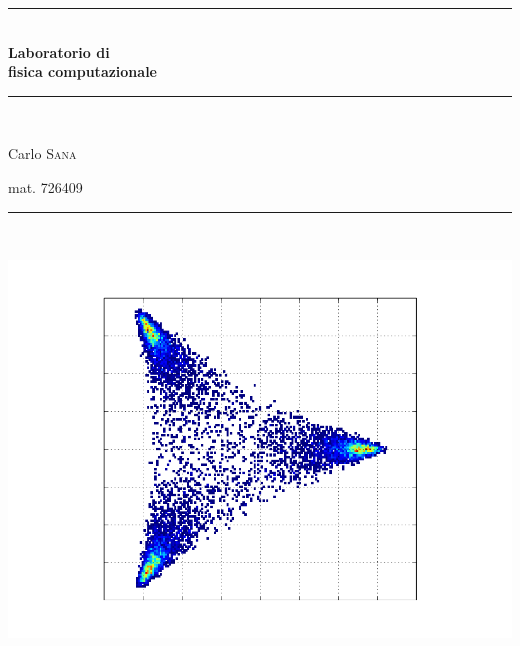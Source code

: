 \newcommand{\HRule}{\rule{\linewidth}{0.5mm}}
\begin{titlepage}
 \begin{center}
  \HRule \\[0.4cm]
{ \huge \bfseries Laboratorio di \\
fisica computazionale}\\[0.4cm]
\HRule \\[1cm]
\begin{flushleft} \Large
Carlo \textsc{Sana} 
\end{flushleft}

\begin{flushright} \Large
	mat. 726409
\end{flushright}
\HRule \\[1cm]

\end{center}

\begin{center}
	\includegraphics[scale=1]{cover.png}
\end{center}
\end{titlepage}
